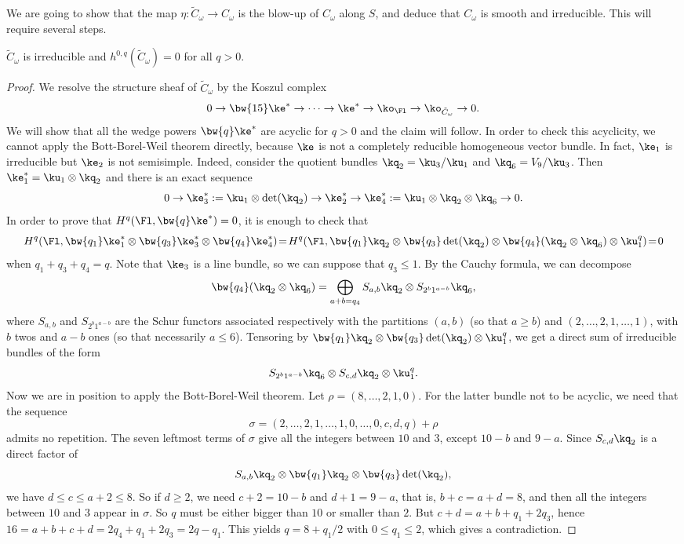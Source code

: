 We are going to show that the map $\eta: \tilde{C}_{\omega} \to C_\omega$ is the blow-up of $C_\omega$ along $S$,
and deduce that $C_\omega$ is smooth and irreducible. This will require several steps.

\begin{lemma}\label{van}
$\tilde C_\omega$ is irreducible and $h^{0,q}(\tilde C_\omega)=0$ for all $q>0$.
\end{lemma}

\begin{proof}
We resolve the structure sheaf of $\tilde C_\omega$ by the Koszul complex
\begin{equation*}\label{koszulctilde}
0\to \bw{15}\ke^*\to\cdots \to \ke^*\to\ko_{\Fl}\to \ko_{\tilde C_\omega}\to 0.
\end{equation*}
We will show that all the wedge powers $\bw{q}\ke^*$ are acyclic for $q>0$ and the claim will follow.
In order to check this acyclicity, we cannot apply the Bott-Borel-Weil theorem directly, because $\ke$ is not a completely reducible
homogeneous vector bundle. In fact, $\ke_1$ is irreducible but $\ke_2$ is not semisimple. Indeed, consider the
quotient bundles $\kq_2=\ku_3/\ku_1$ and $\kq_6=V_9/\ku_3$. Then $\ke_1^*=\ku_1\otimes \kq_2$ and there is an exact sequence
\[
 0\to \ke_3^*:=\ku_1\otimes \det(\kq_2)\to \ke_2^*\to \ke_4^*:=\ku_1\otimes \kq_2\otimes \kq_6\to 0.
\]
In order to prove that $H^q(\Fl,\bw{q}\ke^*)=0$, it is enough to check that
\[
H^q(\Fl,\bw{q_1}\ke_1^*\otimes\bw{q_3}\ke_3^*\otimes \bw{q_4}\ke_4^*)\!=\!
H^q(\Fl,\bw{q_1}\kq_2\otimes\bw{q_3}\det(\kq_2)\otimes \bw{q_4}(\kq_2\otimes \kq_6)\otimes \ku_1^q)\!=\!0
\]
when $q_1+q_3+q_4=q$. Note that $\ke_3$ is a line bundle, so we can suppose that $q_3\le 1$.
By the Cauchy formula, we can decompose
\[
\bw{q_4}(\kq_2\otimes \kq_6)=\bigoplus_{a+b=q_4}S_{a,b}\kq_2\otimes S_{2^b1^{a-b}}\kq_6,
\]
where $S_{a,b}$ and $S_{2^b1^{a-b}}$ are the Schur functors associated respectively with the partitions
$(a,b)$ (so that $a\ge b$) and $(2,\ldots ,2,1,\ldots ,1)$, with $b$ twos and $a-b$ ones (so that necessarily $a\le 6$). Tensoring by
$\bw{q_1}\kq_2\otimes\bw{q_3}\det(\kq_2)\otimes \ku_1^q$, we get a direct sum of irreducible bundles
of the form
\[
S_{2^b1^{a-b}}\kq_6\otimes S_{c,d}\kq_2\otimes \ku_1^q.
\]
Now we are in position to apply the Bott-Borel-Weil theorem. Let $\rho=(8,\ldots ,2,1,0)$. For the latter bundle not
to be acyclic, we need that the sequence \[
\sigma =(2,\ldots ,2,1,\ldots ,1,0,\ldots ,0,c,d,q)+\rho
\]
admits no repetition. The seven leftmost terms of $\sigma$ give all the integers between $10$ and $3$, except
$10-b$ and $9-a$. Since $S_{c,d}\kq_2$ is a direct factor of
\[
S_{a,b}\kq_2\otimes \bw{q_1}\kq_2\otimes\bw{q_3}\det(\kq_2),
\]
we have $d\le c\le a+2\le 8$. So if $d\ge 2$, we need $c+2=10-b$ and $d+1=9-a$, that is, $b+c=a+d=8$, and then all
the integers between $10$ and $3$ appear in $\sigma$. So $q$ must be either bigger than $10$ or smaller than $2$.
But $c+d=a+b+q_1+2q_3$, hence $16=a+b+c+d=2q_4+q_1+2q_3=2q-q_1$. This yields $q=8+q_1/2$ with $0\le q_1\le 2$, which
gives a contradiction.


\end{proof}
